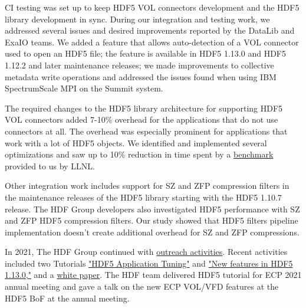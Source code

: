 CI testing was set up to keep HDF5 VOL connectors development and the HDF5 library development in sync. During our integration and testing work, we addressed several issues and desired improvements reported by the DataLib and ExaIO teams. We added a feature that allows auto-detection of a VOL connector used to open an HDF5 file; the feature is available in HDF5 1.13.0 and HDF5 1.12.2 and later maintenance releases; we made improvements to collective metadata write operations and addressed the issues found when using IBM SpectrumScale MPI on the Summit system.

The required changes to the HDF5 library architecture for supporting HDF5 VOL connectors added 7-10\% overhead for the applications that do not use connectors at all. The overhead was especially prominent for applications that work with a lot of HDF5 objects. We identified and implemented several optimizations and saw up to 10\% reduction in time spent by a \href{https://jira.hdfgroup.org/browse/HDFFV-9671}{benchmark} provided to us by LLNL. 

Other integration work includes support for SZ and ZFP compression filters in the maintenance releases of the HDF5 library starting with the HDF5 1.10.7 release. The HDF Group developers also investigated HDF5 performance with SZ and ZFP HDF5 compression filters. Our study showed that HDF5 filters pipeline implementation doesn't create additional overhead for SZ and ZFP compressions.

In 2021, The HDF Group continued with \href{https://www.hdfgroup.org/category/hdf5-resources-for-ecp-users/}{outreach activities}. Recent activities included two Tutorials \href{https://www.hdfgroup.org/2021/05/webinar-followup-hdf5-application-tuning-there-is-more-than-one-way-to-skin-a-catfish-part-2/} {"HDF5 Application Tuning"} and \href{https://www.hdfgroup.org/2021/09/webinar-followup-new-features-in-the-hdf5-1-13-0-release}{"New features in HDF5 1.13.0,"} and a \href{https://portal.hdfgroup.org/pages/viewpage.action?pageId=73924784}{white paper}. The HDF team delivered HDF5 tutorial for ECP 2021 annual meeting and gave a talk on the new ECP VOL/VFD features at the HDF5 BoF at the annual meeting.

